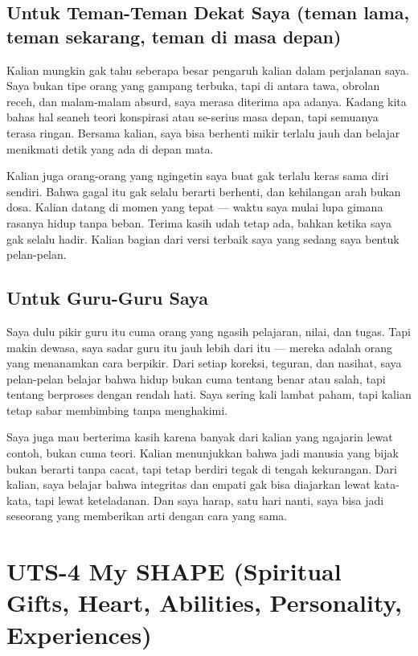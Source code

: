 \documentclass[
  letterpaper,
  DIV=11,
  numbers=noendperiod]{scrreprt}
\begin{document}
\section{Untuk Teman-Teman Dekat Saya (teman lama, teman sekarang, teman
di masa
depan)}\label{untuk-teman-teman-dekat-saya-teman-lama-teman-sekarang-teman-di-masa-depan}

Kalian mungkin gak tahu seberapa besar pengaruh kalian dalam perjalanan
saya. Saya bukan tipe orang yang gampang terbuka, tapi di antara tawa,
obrolan receh, dan malam-malam absurd, saya merasa diterima apa adanya.
Kadang kita bahas hal seaneh teori konspirasi atau se-serius masa depan,
tapi semuanya terasa ringan. Bersama kalian, saya bisa berhenti mikir
terlalu jauh dan belajar menikmati detik yang ada di depan mata.

Kalian juga orang-orang yang ngingetin saya buat gak terlalu keras sama
diri sendiri. Bahwa gagal itu gak selalu berarti berhenti, dan
kehilangan arah bukan dosa. Kalian datang di momen yang tepat --- waktu
saya mulai lupa gimana rasanya hidup tanpa beban. Terima kasih udah
tetap ada, bahkan ketika saya gak selalu hadir. Kalian bagian dari versi
terbaik saya yang sedang saya bentuk pelan-pelan.

\section{Untuk Guru-Guru Saya}\label{untuk-guru-guru-saya}

Saya dulu pikir guru itu cuma orang yang ngasih pelajaran, nilai, dan
tugas. Tapi makin dewasa, saya sadar guru itu jauh lebih dari itu ---
mereka adalah orang yang menanamkan cara berpikir. Dari setiap koreksi,
teguran, dan nasihat, saya pelan-pelan belajar bahwa hidup bukan cuma
tentang benar atau salah, tapi tentang berproses dengan rendah hati.
Saya sering kali lambat paham, tapi kalian tetap sabar membimbing tanpa
menghakimi.

Saya juga mau berterima kasih karena banyak dari kalian yang ngajarin
lewat contoh, bukan cuma teori. Kalian menunjukkan bahwa jadi manusia
yang bijak bukan berarti tanpa cacat, tapi tetap berdiri tegak di tengah
kekurangan. Dari kalian, saya belajar bahwa integritas dan empati gak
bisa diajarkan lewat kata-kata, tapi lewat keteladanan. Dan saya harap,
satu hari nanti, saya bisa jadi seseorang yang memberikan arti dengan
cara yang sama.


\chapter{UTS-4 My SHAPE (Spiritual Gifts, Heart, Abilities, Personality,
Experiences)}\label{uts-4-my-shape-spiritual-gifts-heart-abilities-personality-experiences}
\end{document}

